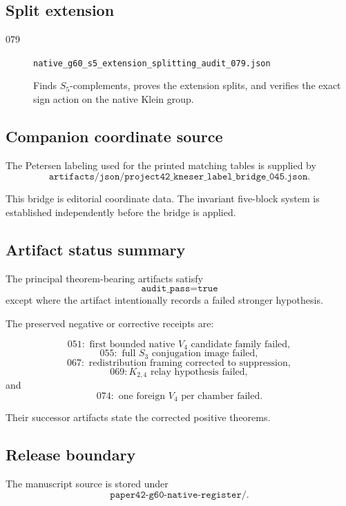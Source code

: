 \subsection{Split extension}

\begin{description}
    \item[079]
    \texttt{native\_g60\_s5\_extension\_splitting\_audit\_079.json}

    Finds \(S_5\)-complements, proves the extension splits, and verifies
    the exact sign action on the native Klein group.
\end{description}

\subsection{Companion coordinate source}

The Petersen labeling used for the printed matching tables is supplied
by
\[
\texttt{artifacts/json/project42\_kneser\_label\_bridge\_045.json}.
\]

This bridge is editorial coordinate data. The invariant five-block
system is established independently before the bridge is applied.

\subsection{Artifact status summary}

The principal theorem-bearing artifacts satisfy
\[
\texttt{audit\_pass=true}
\]
except where the artifact intentionally records a failed stronger
hypothesis.

The preserved negative or corrective receipts are:

\[
051:
\text{ first bounded native \(V_4\) candidate family failed},
\]
\[
055:
\text{ full \(S_3\) conjugation image failed},
\]
\[
067:
\text{ redistribution framing corrected to suppression},
\]
\[
069:
K_{2,4}\text{ relay hypothesis failed},
\]
and
\[
074:
\text{ one foreign \(V_4\) per chamber failed}.
\]

Their successor artifacts state the corrected positive theorems.

\subsection{Release boundary}

The manuscript source is stored under
\[
\texttt{paper42-g60-native-register/}.
\]


